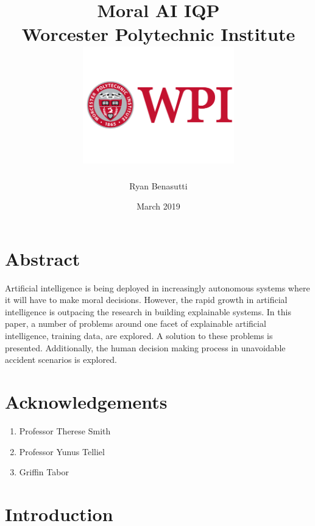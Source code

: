 \documentclass{report}
\title{
    {Moral AI IQP}\\
    {\large Worcester Polytechnic Institute}\\
    {\includegraphics[height=2in]{figures/WPI_Inst_Prim_FulClr.png}}
}
\author{Ryan Benasutti}
\date{March 2019}
\begin{document}
\maketitle

\clearpage
\mbox{}
\clearpage

\chapter*{Abstract}

Artificial intelligence is being deployed in increasingly autonomous systems where it will have to
make moral decisions. However, the rapid growth in artificial intelligence is outpacing the research
in building explainable systems. In this paper, a number of problems around one facet of explainable
artificial intelligence, training data, are explored. A solution to these problems is presented.
Additionally, the human decision making process in unavoidable accident scenarios is explored.

\chapter*{Acknowledgements}

\begin{enumerate}
    \item Professor Therese Smith
    \item Professor Yunus Telliel
    \item Griffin Tabor
\end{enumerate}

\tableofcontents

\chapter{Introduction}
\end{document}
